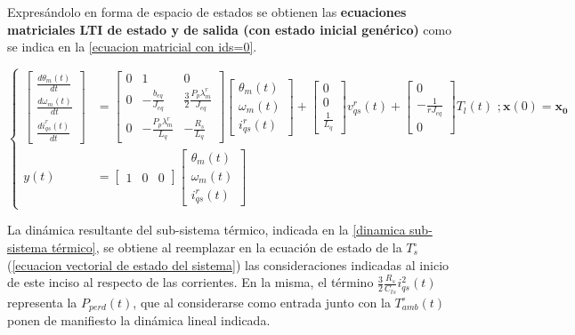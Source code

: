 \documentclass[a4paper, 10pt, onecolumn,journal]{ieeeconf}
\begin{document}
Expresándolo en forma de espacio de estados se obtienen las
\textbf{ecuaciones matriciales LTI de estado y de salida (con estado inicial genérico)}
como se indica en la \cref{ecuacion matricial con ids=0}.

\begin{equation}
	\begin{cases}
		\begin{bmatrix}
			\frac{d \theta_m(t)}{dt} \\ 
			\frac{d \omega_m(t)}{dt}\\
			\frac{d i^r_{qs}(t)}{dt}  
		\end{bmatrix}
		 &= 
		 \begin{bmatrix}
		 	0 & 1 & 0 \\ 
		 	0 & - \frac{b_{eq}}{J_{eq}} & \frac{3}{2} \frac{P_p \lambda^r_m}{J_{eq}} \\
		 	0 &  - \frac{P_p  \lambda^r_m}{L_q} & -\frac{R_s}{L_q}
		 \end{bmatrix}
		 \begin{bmatrix}
		 	{\theta}_m(t) \\ 
		 	{\omega}_m(t)\\
		 	{i}^r_{qs}(t)  
		 \end{bmatrix}
		 +
		 \begin{bmatrix}
		 	0 \\ 
		 	0\\
		 	\frac{1}{L_q}  
		 \end{bmatrix}
		 v^r_{qs}(t)+
		 \begin{bmatrix}
		 	0 \\ 
		 	- \frac{1}{r J_{eq}}\\
		 	0 
		 \end{bmatrix} T_l(t)\,\,; \mathbf{x}(0) = \mathbf{x_0}\\
		 y(t) &= \begin{bmatrix}
		 		1 & 0 & 0
		 	 \end{bmatrix}
		 	 \begin{bmatrix}
		 	 	{\theta}_m(t) \\ 
		 	 	{\omega}_m(t)\\
		 	 	{i}^r_{qs}(t)
		 	 \end{bmatrix}
	\end{cases}
	\label{ecuacion matricial con ids=0}
\end{equation}

La dinámica resultante del sub-sistema térmico,
indicada en la \cref{dinamica sub-sistema térmico},
se obtiene al reemplazar en la ecuación de estado de la $T^{\circ}_s$
(\cref{ecuacion vectorial de estado del sistema}) las consideraciones indicadas al inicio de este inciso al
respecto de las corrientes. En la misma, el término $\frac{3}{2}\frac{R_{s}}{C_{ts}} i_{qs}^2(t)$ representa
la $P_{perd}(t)$, que al considerarse como entrada junto con la $T^{\circ}_{amb}(t)$ ponen de
manifiesto la dinámica lineal indicada.
\end{document}
